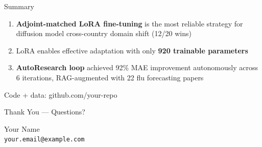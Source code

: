 \documentclass[10pt]{beamer}
\begin{document}
\begin{frame}{Summary}

  \begin{enumerate}
    \item \textbf{Adjoint-matched LoRA fine-tuning} is the most reliable
          strategy for diffusion model cross-country domain shift
          \hfill (12/20 wins)
    \item LoRA enables effective adaptation with only \textbf{920 trainable
          parameters}
    \item \textbf{AutoResearch loop} achieved 92\% MAE improvement
          autonomously across 6 iterations, RAG-augmented with 22 flu
          forecasting papers
  \end{enumerate}

  \vspace{0.5cm}
  \begin{center}
    {\large \textcolor{mlssblue}{Code + data: github.com/your-repo}}
  \end{center}

\end{frame}

\begin{frame}{\textcolor{mlssblue}{Thank You --- Questions?}}
  \vfill
  \begin{center}
    \large Your Name\\
    \texttt{your.email@example.com}
  \end{center}
  \vfill
\end{frame}
\end{document}
